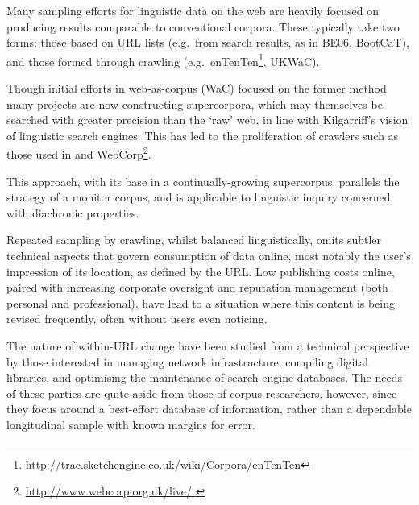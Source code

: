 


Many sampling efforts for linguistic data on the web are heavily focused on producing results comparable to conventional corpora.  These typically take two forms: those based on URL lists (e.g.\ from search results, as in %
BE06\cite{baker2009be06}, BootCaT\cite{baroni2004bootcat}), and those formed through crawling (e.g.\ enTenTen\footnote{\url{http://trac.sketchengine.co.uk/wiki/Corpora/enTenTen}},
UKWaC\cite{ferraresi2008introducing}).

Though initial efforts in web-as-corpus (WaC) focused on the former method %
many projects are now constructing supercorpora, which may themselves be searched with greater precision than the `raw' web, in line with Kilgarriff's vision of linguistic search engines\cite{kilgarriff2003linguistic}.  This has led to the proliferation of crawlers such as those used in\cite{schafer8building} and WebCorp\footnote{\url{http://www.webcorp.org.uk/live/
}}\cite{renouf2003webcorp}.


This approach, with its base in a continually-growing supercorpus, parallels the strategy of a monitor corpus\cite{sinclair1982monitor}, and is applicable to linguistic inquiry concerned with diachronic properties\cite{kehoe2006diachronic}.


Repeated sampling by crawling, whilst balanced linguistically, omits subtler technical aspects that govern consumption of data online, most notably the user's impression of its location, as defined by the URL\@.  Low publishing costs online, paired with increasing corporate oversight and reputation management (both personal\cite{ICT4DBibliography1650} 
and professional\cite{Malaga2000repman}), have lead to a situation where this content is being revised frequently, often without users even noticing.

The nature of within-URL change have been studied from a technical perspective by those interested in managing network infrastructure, compiling digital libraries\cite{tyler2003librarians}, and optimising the maintenance of search engine databases\cite{koehler2004longitudinal}.  The needs of these parties are quite aside from those of corpus researchers, however, since they focus around a best-effort database of information, rather than a dependable longitudinal sample with known margins for error.


